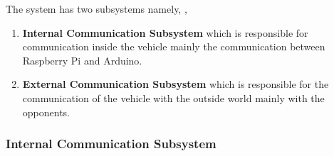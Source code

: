 \documentclass[a4paper,12pt]{article}
\begin{document}
	The system has two subsystems namely, 	,

	\begin{enumerate}
		\item \textbf{Internal Communication Subsystem} which is responsible for communication inside the vehicle mainly the communication between Raspberry Pi and Arduino.						
		\item \textbf{External Communication Subsystem} which is responsible for the communication of the vehicle with the outside world mainly with the opponents.
	\end{enumerate}		


\subsubsection{Internal Communication Subsystem}
\end{document}
